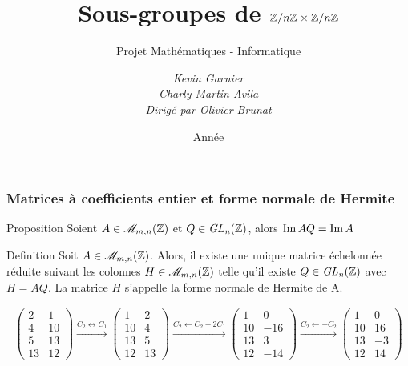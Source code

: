 \documentclass[10pt]{beamer}
\title{Sous-groupes de $\mathbb Z/n\mathbb Z \times \mathbb Z/n\mathbb Z$}
\subtitle{Projet Mathématiques - Informatique}
\author[Kevin Garnier, Charly Martin Avila, Olivier Brunat]{
	\itshape {Kevin Garnier \\
		Charly Martin Avila}\\
		\vspace*{1cm}
	Dirigé par
	Olivier Brunat
}
\date{Année \the\year}
\begin{document}
\begin{frame}
	\titlepage
\end{frame}

\begin{frame}
	\frametitle{Matrices à coefficients entier et forme normale de Hermite}
	\begin{block}{Proposition}
		\label{ima_imaq}
		Soient $A \in \mathscr{M}_{m,n}(\mathbb Z)$ et $Q \in \it {GL}_n(\mathbb Z)$, alors
		$\operatorname{Im} AQ = \operatorname{Im} A$
	\end{block}
	\begin{alertblock}{Definition}
		Soit $A \in \mathscr{M}_{m,n}(\mathbb Z)$. Alors, il existe une unique matrice échelonnée
		réduite suivant les colonnes $H \in \mathscr{M}_{m,n}(\mathbb Z)$ telle qu'il existe $Q \in \it {GL}_n(\mathbb Z)$
		avec $H = AQ$. La matrice $H$ s'appelle la forme normale de Hermite de A.
	\end{alertblock}
	\begin{example}
		\begin{equation*}
			\begin{split}
				\begin{pmatrix}
					2  & 1  \\
					4  & 10 \\
					5  & 13 \\
					13 & 12
				\end{pmatrix}
				\overset{C_2 \leftrightarrow C_1}{\longrightarrow}
				\begin{pmatrix}
					1  & 2  \\
					10 & 4  \\
					13 & 5  \\
					12 & 13
				\end{pmatrix}
				\overset{C_2 \leftarrow C_2 - 2C_1}{\longrightarrow}
				\begin{pmatrix}
					1  & 0   \\
					10 & -16 \\
					13 & 3   \\
					12 & -14
				\end{pmatrix}
				\overset{C_2 \leftarrow - C_2}{\longrightarrow}
				\begin{pmatrix}
					1  & 0  \\
					10 & 16 \\
					13 & -3 \\
					12 & 14
				\end{pmatrix}
			\end{split}
		\end{equation*}
	\end{example}
\end{frame}
\end{document}
